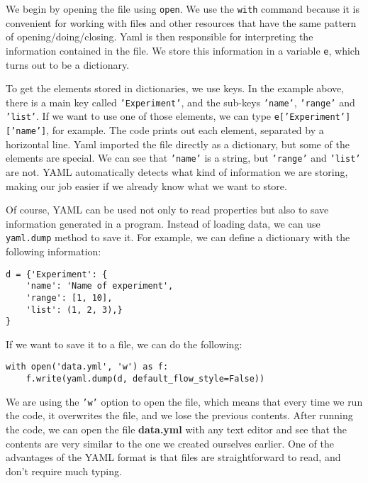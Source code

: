 We begin by opening the file using \texttt{open}. We use the \texttt{with} command because it is convenient for working with files and other resources that have the same pattern of opening/doing/closing. Yaml is then responsible for interpreting the information contained in the file. We store this information in a variable \texttt{e}, which turns out to be a dictionary.

To get the elements stored in dictionaries, we use keys. In the example above, there is a main key called \texttt{'Experiment'}, and the sub-keys \texttt{'name'}, \texttt{'range'} and \texttt{'list'}. If we want to use one of those elements, we can type \texttt{e['Experiment']['name']}, for example. The code prints out each element, separated by a horizontal line. Yaml imported the file directly as a dictionary, but some of the elements are special. We can see that \texttt{'name'} is a string, but \texttt{'range'} and \texttt{'list'} are not. {YAML} automatically detects what kind of information we are storing, making our job easier if we already know what we want to store.



Of course, YAML can be used not only to read properties but also to save information generated in a program. Instead of loading data, we can use \texttt{yaml.dump} method to save it. For example, we can define a dictionary with the following information:

\begin{verbatim}
d = {'Experiment': {
    'name': 'Name of experiment',
    'range': [1, 10],
    'list': (1, 2, 3),}
}
\end{verbatim}

If we want to save it to a file, we can do the following:

\begin{verbatim}
with open('data.yml', 'w') as f:
    f.write(yaml.dump(d, default_flow_style=False))
\end{verbatim}

We are using the \texttt{'w'} option to open the file, which means that every time we run the code, it overwrites the file, and we lose the previous contents. After running the code, we can open the file \textbf{data.yml} with any text editor and see that the contents are very similar to the one we created ourselves earlier. One of the advantages of the YAML format is that files are straightforward to read, and don't require much typing.

